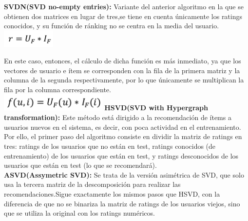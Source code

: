 		\textbf{SVDN(SVD no-empty entries):} Variante del anterior algoritmo en la que se obtienen dos matrices en lugar de tres,se tiene en cuenta únicamente los ratings conocidos, y su función de ránking no se centra en la media del usuario.\cite{43}\\
		\includegraphics[width=0.2\textwidth]{images/svdn1}

		En este caso, entonces, el cálculo de dicha función es más inmediato, ya que los vectores de usuario e ítem se corresponden con la fila de la primera matriz y la columna de la segunda respectivamente, por lo que únicamente se multiplican la fila por la columna correspondiente.\cite{43}\\
		\includegraphics[width=0.4\textwidth]{images/svdn2}
		\newpage
		\textbf{HSVD(SVD with Hypergraph transformation):} Este método está dirigido a la recomendación de ítems a usuarios nuevos en el sistema, es decir, con poca actividad en el entrenamiento. Por ello, el primer paso del algoritmo consiste en dividir la matriz de ratings en tres: ratings de los usuarios que no están en test, ratings conocidos (de entrenamiento) de los usuarios que están en test, y ratings desconocidos de los usuarios que están en test (lo que se recomendará).\cite{43}\\

		\textbf{ASVD(Assymetric SVD):} Se trata de la versión asimétrica de SVD, que solo usa la tercera matriz de la descomposición para realizar las recomendaciones.Sigue exactamente los mismos pasos que HSVD, con la diferencia de que no se binariza la matriz de ratings de los usuarios viejos, sino que se utiliza la original con los ratings numéricos.\cite{43}

